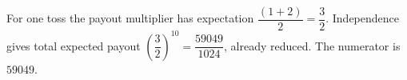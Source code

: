 For one toss the payout multiplier has expectation $\dfrac{(1+2)}{2}=\dfrac{3}{2}$. Independence gives total expected payout $(\dfrac{3}{2})^{10}=\dfrac{59049}{1024}$, already reduced. The numerator is $\boxed{59049}$.
